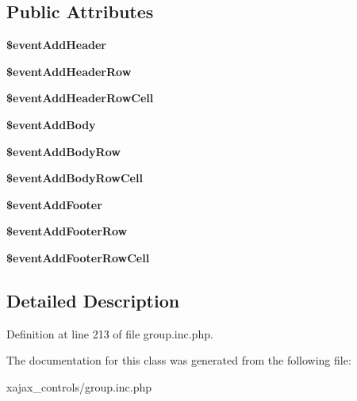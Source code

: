 \subsection*{Public Attributes}
\begin{DoxyCompactItemize}
\item 
\hypertarget{classclsTable_afbd5840a2a501760896040be7269f2c3}{
{\bfseries \$eventAddHeader}}
\label{classclsTable_afbd5840a2a501760896040be7269f2c3}

\item 
\hypertarget{classclsTable_a02793ce10e9f2a13adadae093d13d184}{
{\bfseries \$eventAddHeaderRow}}
\label{classclsTable_a02793ce10e9f2a13adadae093d13d184}

\item 
\hypertarget{classclsTable_a8255f4f6501406487e301cb004a534f5}{
{\bfseries \$eventAddHeaderRowCell}}
\label{classclsTable_a8255f4f6501406487e301cb004a534f5}

\item 
\hypertarget{classclsTable_a3d6ba79954be0985a13e85097339851e}{
{\bfseries \$eventAddBody}}
\label{classclsTable_a3d6ba79954be0985a13e85097339851e}

\item 
\hypertarget{classclsTable_a34f86fe81d1a9b1e6d4106bd4a02bc43}{
{\bfseries \$eventAddBodyRow}}
\label{classclsTable_a34f86fe81d1a9b1e6d4106bd4a02bc43}

\item 
\hypertarget{classclsTable_a5420e6ec2a4825a250d9e476ca150f3b}{
{\bfseries \$eventAddBodyRowCell}}
\label{classclsTable_a5420e6ec2a4825a250d9e476ca150f3b}

\item 
\hypertarget{classclsTable_a6a540ea96933eccd4fce135c8bebb63c}{
{\bfseries \$eventAddFooter}}
\label{classclsTable_a6a540ea96933eccd4fce135c8bebb63c}

\item 
\hypertarget{classclsTable_af3957e37638e07d438a29b94774ae3c3}{
{\bfseries \$eventAddFooterRow}}
\label{classclsTable_af3957e37638e07d438a29b94774ae3c3}

\item 
\hypertarget{classclsTable_acd4ca0fd9d65548f554f71a56ca9bd43}{
{\bfseries \$eventAddFooterRowCell}}
\label{classclsTable_acd4ca0fd9d65548f554f71a56ca9bd43}

\end{DoxyCompactItemize}


\subsection{Detailed Description}


Definition at line 213 of file group.inc.php.



The documentation for this class was generated from the following file:\begin{DoxyCompactItemize}
\item 
xajax\_\-controls/group.inc.php\end{DoxyCompactItemize}
